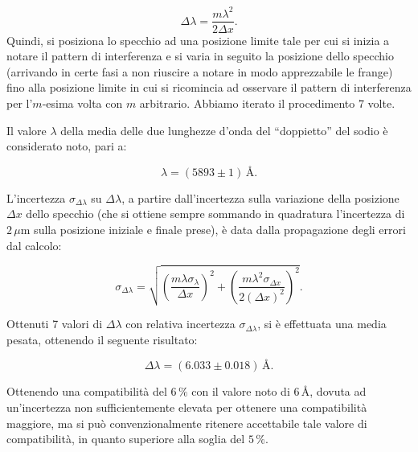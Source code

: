 \documentclass[a4paper,12pt]{article}
\begin{document}
\begin{equation}
\Delta\lambda = \frac{m\lambda^2}{2\Delta x}.
\end{equation}
Quindi, si posiziona lo specchio ad una posizione limite tale per cui si inizia a notare il pattern di interferenza e si varia in seguito la posizione dello specchio (arrivando in certe fasi a non riuscire a notare in modo apprezzabile le frange) fino alla posizione limite in cui si ricomincia ad osservare il pattern di interferenza per l’\( m \)-esima volta con \( m \) arbitrario. Abbiamo iterato il procedimento 7 volte.

Il valore \( \lambda \) della media delle due lunghezze d’onda del “doppietto” del sodio è considerato noto, pari a:

\begin{equation}
\lambda = (5893 \pm 1) \, \text{\AA}.
\end{equation}

L’incertezza \( \sigma_{\Delta\lambda} \) su \( \Delta\lambda \), a partire dall’incertezza sulla variazione della posizione \( \Delta x \) dello specchio (che si ottiene sempre sommando in quadratura l’incertezza di \( 2 \, \mu\text{m} \) sulla posizione iniziale e finale prese), è data dalla propagazione degli errori dal calcolo:

\begin{equation}
\sigma_{\Delta\lambda} = \sqrt{\left(\frac{m\lambda\sigma_\lambda}{\Delta x}\right)^2 + \left(\frac{m\lambda^2\sigma_{\Delta x}}{2(\Delta x)^2}\right)^2}.
\end{equation}

Ottenuti 7 valori di \( \Delta\lambda \) con relativa incertezza \( \sigma_{\Delta\lambda} \), si è effettuata una media pesata, ottenendo il seguente risultato:

\begin{equation}
\Delta\lambda = (6.033 \pm 0.018) \, \text{\AA}.
\end{equation}

Ottenendo una compatibilità del \( 6 \, \% \) con il valore noto di \( 6 \, \text{\AA} \), dovuta ad un’incertezza non sufficientemente elevata per ottenere una compatibilità maggiore, ma si può convenzionalmente ritenere accettabile tale valore di compatibilità, in quanto superiore alla soglia del \( 5 \, \% \).
\end{document}
